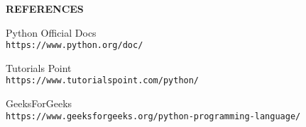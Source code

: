 \documentclass{beamer}
\begin{document}
\begin{darkframes}
  \begin{frame}{\textbf{REFERENCES}}
\begin{thebibliography}{9}
Python Official Docs \\
\texttt{https://www.python.org/doc/}
 
Tutorials Point \\
\texttt{https://www.tutorialspoint.com/python/}

GeeksForGeeks
\\\texttt{https://www.geeksforgeeks.org/python-programming-language/}
\end{thebibliography}
  \end{frame}
    \end{darkframes}
\end{document}
